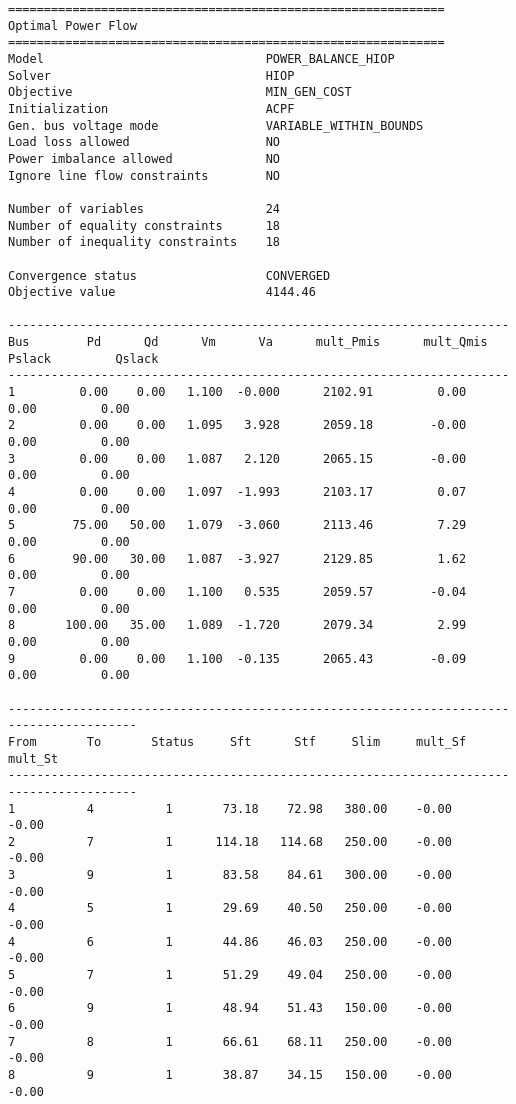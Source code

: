 \begin{lstlisting}
=============================================================
Optimal Power Flow
=============================================================
Model                               POWER_BALANCE_HIOP
Solver                              HIOP
Objective                           MIN_GEN_COST
Initialization                      ACPF
Gen. bus voltage mode               VARIABLE_WITHIN_BOUNDS
Load loss allowed                   NO
Power imbalance allowed             NO
Ignore line flow constraints        NO

Number of variables                 24
Number of equality constraints      18
Number of inequality constraints    18

Convergence status                  CONVERGED
Objective value                     4144.46

----------------------------------------------------------------------
Bus        Pd      Qd      Vm      Va      mult_Pmis      mult_Qmis      Pslack         Qslack        
----------------------------------------------------------------------
1         0.00    0.00   1.100  -0.000      2102.91         0.00         0.00         0.00
2         0.00    0.00   1.095   3.928      2059.18        -0.00         0.00         0.00
3         0.00    0.00   1.087   2.120      2065.15        -0.00         0.00         0.00
4         0.00    0.00   1.097  -1.993      2103.17         0.07         0.00         0.00
5        75.00   50.00   1.079  -3.060      2113.46         7.29         0.00         0.00
6        90.00   30.00   1.087  -3.927      2129.85         1.62         0.00         0.00
7         0.00    0.00   1.100   0.535      2059.57        -0.04         0.00         0.00
8       100.00   35.00   1.089  -1.720      2079.34         2.99         0.00         0.00
9         0.00    0.00   1.100  -0.135      2065.43        -0.09         0.00         0.00

----------------------------------------------------------------------------------------
From       To       Status     Sft      Stf     Slim     mult_Sf  mult_St 
----------------------------------------------------------------------------------------
1          4          1       73.18    72.98   380.00    -0.00    -0.00
2          7          1      114.18   114.68   250.00    -0.00    -0.00
3          9          1       83.58    84.61   300.00    -0.00    -0.00
4          5          1       29.69    40.50   250.00    -0.00    -0.00
4          6          1       44.86    46.03   250.00    -0.00    -0.00
5          7          1       51.29    49.04   250.00    -0.00    -0.00
6          9          1       48.94    51.43   150.00    -0.00    -0.00
7          8          1       66.61    68.11   250.00    -0.00    -0.00
8          9          1       38.87    34.15   150.00    -0.00    -0.00


\end{lstlisting}
